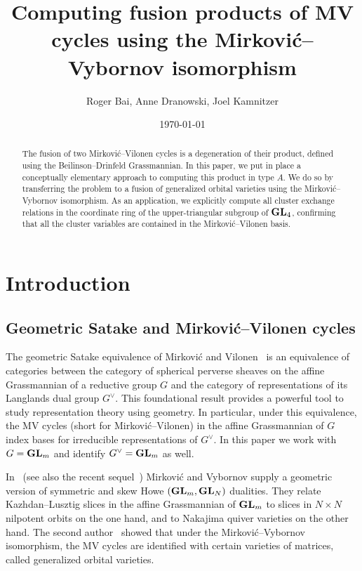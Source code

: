 \documentclass{article}
\title{Computing fusion products of MV cycles using the Mirkovi\'c--Vybornov isomorphism}
\author{Roger Bai, Anne Dranowski, Joel Kamnitzer}
\date{\today}
\begin{document}
\maketitle
\begin{abstract}
    The fusion of two Mirkovi\'c--Vilonen cycles is a degeneration of their product, defined using the Beilinson--Drinfeld Grassmannian.  In this paper, we put in place a conceptually elementary approach to computing this product in type \(A\).  We do so by transferring the problem to a fusion of generalized orbital varieties using the Mirkovi\'c--Vybornov isomorphism.  As an application, we explicitly compute all cluster exchange relations in the coordinate ring of the upper-triangular subgroup of \( {\mathbf{GL}}_4\), confirming that all the cluster variables are contained in the Mirkovi\'c--Vilonen basis.
\end{abstract}

\section{Introduction}\label{s:intro}
% 
\subsection{Geometric Satake and Mirkovi\'c--Vilonen cycles}\label{ss:gsmv}
% 
The geometric Satake equivalence of Mirkovi\'c and Vilonen~\cite{mirkovic2007geometric} is an equivalence of categories between the category of spherical perverse sheaves on the affine Grassmannian of a reductive group \( G \) and the category of representations of its Langlands dual group \(G^\vee \).  This foundational result provides a powerful tool to study representation theory using geometry.  In particular, under this equivalence, the MV cycles (short for Mirkovi\'c--Vilonen) in the affine Grassmannian of \( G \) index bases for irreducible representations of \( G^\vee \). In this paper we work with \( G = {\mathbf{GL}}_m\) and identify \( G^\vee = {\mathbf{GL}}_m\) as well.

In~\cite{mirkovic2007quiver} (see also the recent sequel~\cite{mirkovic2019comparison}) Mirkovi\'c and Vybornov supply a geometric version of symmetric and skew Howe \(({\mathbf{GL}}_m,{\mathbf{GL}}_N)\) dualities.  They relate Kazhdan--Lusztig slices in the affine Grassmannian of \({\mathbf{GL}}_m\) to slices in \(N\times N\) nilpotent orbits on the one hand, and to Nakajima quiver varieties on the other hand.    The second author~\cite{dthesis} showed  that under the Mirkovi\'c--Vybornov isomorphism, the MV cycles are identified with certain varieties of matrices, called generalized orbital varieties.
\end{document}
